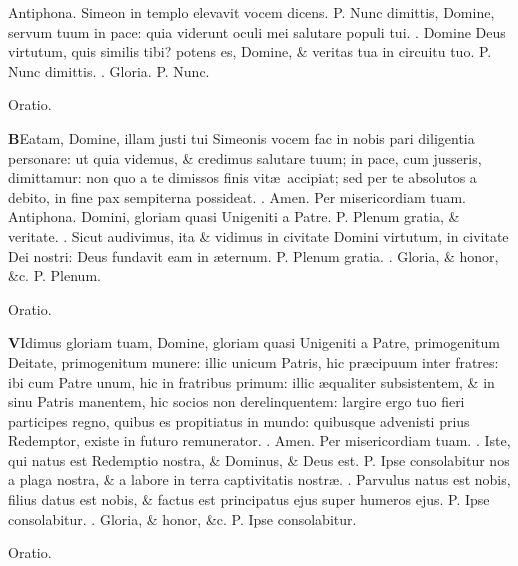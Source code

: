 \documentclass[letter,11pt]{book}
\makeatletter
\DeclareRobustCommand{\Vbar}{\vers@resp{-0.1em}{V}}
\DeclareRobustCommand{\Rbar}{\vers@resp{0pt}{R}}
\newcommand{\vers@resp@sym}{\raisebox{0.2ex}{\rotatebox[origin=c]{-20}{$\m@th\rceil$}}}
\newcommand{\vers@resp}[2]{%
  {\ooalign{\hidewidth\kern#1\vers@resp@sym\hidewidth\cr#2\cr}}%
}%
\def\P{\color{Red} P. \color{black}}
\def\V{\color{Red} \Vbar . \color{black}}
\def\R{\color{Red} \Rbar . \color{black}}
\makeatother
\begin{document}
\begin{multicols*}{2}
\newline \color{Red} Antiphona. \color{black} Simeon in templo elevavit vocem dicens. \P Nunc dimittis, Domine, servum tuum in pace: quia viderunt oculi mei salutare populi tui. \V Domine Deus virtutum, quis similis tibi? potens es, Domine, \& veritas tua in circuitu tuo. \P Nunc dimittis. \V Gloria. \P Nunc.
\vspace{-.5em} \begin{center} \color{Red} Oratio. \color{black} \end{center} \vspace{-.5em}
\lettrine[lines=2]{\bfseries \color{Red} B}{}Eatam, Domine, illam justi tui Simeonis vocem fac in nobis pari diligentia personare: ut quia videmus, \& credimus salutare tuum; in pace, cum jusseris, dimittamur: non quo a te dimissos finis vit\ae \ accipiat; sed per te absolutos a debito, in fine pax sempiterna possideat. \R Amen. Per misericordiam tuam.
\newline \color{Red} Antiphona. \color{black} Domini, gloriam quasi Unigeniti a Patre. \P Plenum gratia, \& veritate. \V Sicut audivimus, ita \& vidimus in civitate Domini virtutum, in civitate Dei nostri: Deus fundavit eam in \ae ternum. \P Plenum gratia. \V Gloria, \& honor, \&c. \P Plenum.
\vspace{-1.5em} \begin{center} \color{Red} Oratio. \color{black} \end{center} \vspace{-.5em}
\lettrine[lines=2]{\bfseries \color{Red} V}{}Idimus gloriam tuam, Domine, gloriam quasi Unigeniti a Patre, primogenitum Deitate, primogenitum munere: illic unicum Patris, hic pr\ae cipuum inter fratres: ibi cum Patre unum, hic in fratribus primum: illic \ae qualiter subsistentem, \& in sinu Patris manentem, hic socios non derelinquentem: largire ergo tuo fieri participes regno, quibus es propitiatus in mundo: quibusque advenisti prius Redemptor, existe in futuro remunerator. \R Amen. Per misericordiam tuam.
\newline \R Iste, qui natus est Redemptio nostra, \& Dominus, \& Deus est. \P Ipse consolabitur nos a plaga nostra, \& a labore in terra
captivitatis nostr\ae . \V Parvulus natus est nobis, filius datus est nobis, \& factus est principatus ejus super humeros ejus. \P Ipse consolabitur. \V Gloria, \& honor, \&c. \P Ipse consolabitur.
\vspace{-.5em} \begin{center} \color{Red} Oratio. \color{black} \end{center} \vspace{-.5em}

\end{multicols*}
\end{document}
